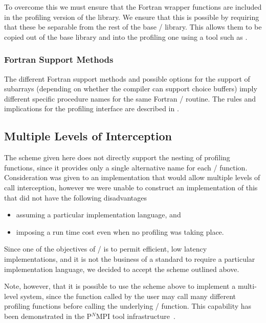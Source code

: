 To overcome this we must ensure that the Fortran wrapper functions are
included in the profiling version of the library.  We ensure that this is
possible by requiring that these be separable from the rest of the base
\MPI/ library.  This allows them to be copied out of the base library and
into the profiling one using a tool such as .

\subsubsection{Fortran Support Methods}

The different Fortran support methods and possible options for the support
of subarrays (depending on whether the compiler can support  choice buffers) imply different specific procedure names for
the same Fortran \MPI/ routine.  The rules and implications for the
profiling interface are described in .
 
\subsection{Multiple Levels of Interception}

The scheme given here does not directly support the nesting of profiling
functions, since it provides only a single alternative name for each \MPI/
function.  Consideration was given to an implementation that  would allow
multiple levels of call interception, however we were unable to construct
an implementation of this that  did not have the following disadvantages
\begin{itemize}
\item
  assuming a particular implementation language, and
\item
  imposing a run time cost even when no profiling was taking place.
\end{itemize}
Since one of the objectives of \MPI/ is to permit efficient, low latency
implementations, and it is not the business of a standard to require a
particular implementation language, we decided to accept the scheme
outlined above.

Note, however, that it is possible to use the scheme above to implement a
multi-level system, since the function called by the user may call many
different profiling functions before calling the underlying \MPI/ function.
This capability has been demonstrated in the P$^N$MPI tool
infrastructure~\cite{schulz+:sc07}.

